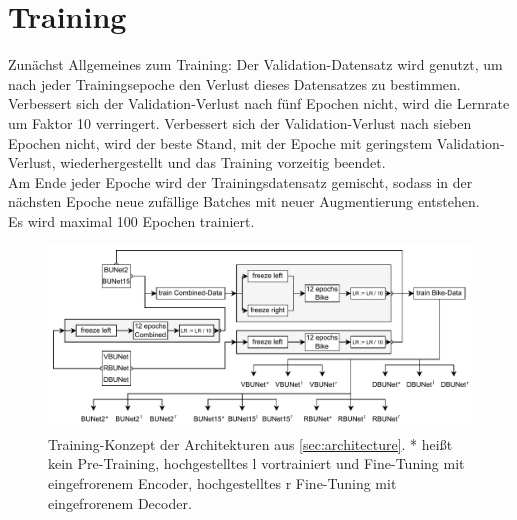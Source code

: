 \section{Training} \label{sec:training}

Zunächst Allgemeines zum Training:
Der Validation-Datensatz wird genutzt, um nach jeder Trainingsepoche den Verlust dieses Datensatzes zu bestimmen. 
Verbessert sich der Validation-Verlust nach fünf Epochen nicht, wird die Lernrate um Faktor 10 verringert. 
Verbessert sich der Validation-Verlust nach sieben Epochen nicht, wird der beste Stand, mit der Epoche mit geringstem 
Validation-Verlust, wiederhergestellt und das Training vorzeitig beendet.  \\
Am Ende jeder Epoche wird der Trainingsdatensatz gemischt, sodass in der nächsten Epoche neue zufällige 
Batches mit neuer Augmentierung entstehen. \\
Es wird maximal 100 Epochen trainiert.

\begin{figure}[h]
	\centering
	\includegraphics[width=1.\textwidth]{Bilder/training-concept.drawio.pdf} 
	\caption{Training-Konzept der Architekturen aus \autoref{sec:architecture}. * heißt kein Pre-Training,
	hochgestelltes l vortrainiert und Fine-Tuning mit eingefrorenem Encoder, hochgestelltes r Fine-Tuning mit eingefrorenem Decoder.}
	\label{fig:training}
\end{figure} 

